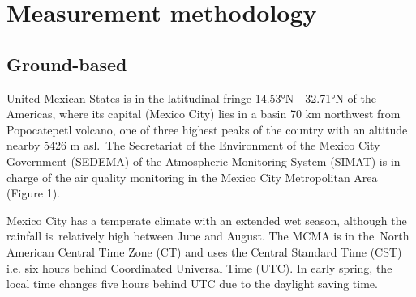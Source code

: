 \documentclass{article}
\begin{document}
{\section*{Measurement methodology}

{\label{321063}}

\subsection*{Ground-based~}

{\label{339070}}

United Mexican States is in the latitudinal fringe 14.53°N - 32.71°N of
the Americas, where its capital (Mexico City) lies in a basin 70 km
northwest from Popocatepetl volcano, one of three highest peaks of the
country with an altitude nearby 5426 m asl.~The Secretariat of the
Environment of the Mexico City Government (SEDEMA) of the Atmospheric
Monitoring System (SIMAT) is in charge of the air quality monitoring in
the Mexico City Metropolitan Area
(Figure 1).~~

Mexico City has a temperate climate with an extended wet season,
although the rainfall is~relatively high between June and August. The
MCMA is in the~North American Central Time Zone (CT) and uses the
Central Standard Time (CST) i.e. six hours behind Coordinated Universal
Time (UTC). In early spring, the local time changes five hours behind
UTC due to the daylight saving time.

}
\end{document}
